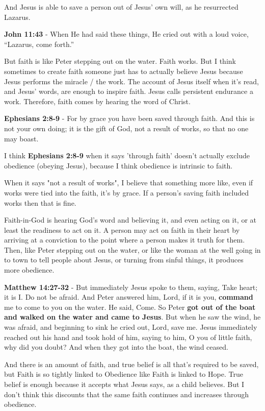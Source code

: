 \documentclass[11pt]{article}
\begin{document}
And Jesus is able to save a person out of Jesus' own will, as he resurrected Lazarus.

\textbf{John 11:43} - When He had said these things, He cried out with a loud voice, “Lazarus, come forth.”

But faith is like Peter stepping out on the water. Faith works. But I think sometimes to create faith someone just has to actually believe Jesus because Jesus performs the miracle / the work. The account of Jesus itself when it's read, and Jesus' words, are enough to inspire faith. Jesus calls persistent endurance a work. Therefore, faith comes by hearing the word of Christ.

\textbf{Ephesians 2:8-9} - For by grace you have been saved through faith. And this is not your own doing; it is the gift of God, not a result of works, so that no one may boast.

I think \textbf{Ephesians 2:8-9} when it says 'through faith' doesn't actually exclude obedience (obeying Jesus), because I think obedience is intrinsic to faith.

When it says "not a result of works", I believe that something more like, even if works were tied into the faith, it's by grace. If a person's saving faith included works then that is fine.

Faith-in-God is hearing God's word and believing it, and even acting on it, or at least the readiness to act on it.
A person may act on faith in their heart by arriving at a conviction to the point where a person makes it truth for them.
Then, like Peter stepping out on the water, or like the woman at the well going in to town to tell people about Jesus, or turning from sinful things, it produces more obedience.

\textbf{Matthew 14:27-32} - But immediately Jesus spoke to them, saying, Take heart; it is I. Do not be afraid. And Peter answered him, Lord, if it is you, \textbf{command} me to come to you on the water. He said, Come. So Peter \textbf{got out of the boat and walked on the water and came to Jesus}. But when he saw the wind, he was afraid, and beginning to sink he cried out, Lord, save me. Jesus immediately reached out his hand and took hold of him, saying to him, O you of little faith, why did you doubt? And when they got into the boat, the wind ceased.

And there is an amount of faith, and true belief is all that's required to be saved, but Faith is so tightly linked to Obedience like Faith is linked to Hope. True belief is enough because it accepts what Jesus says, as a child believes. But I don't think this discounts that the same faith continues and increases through obedience.
\end{document}
